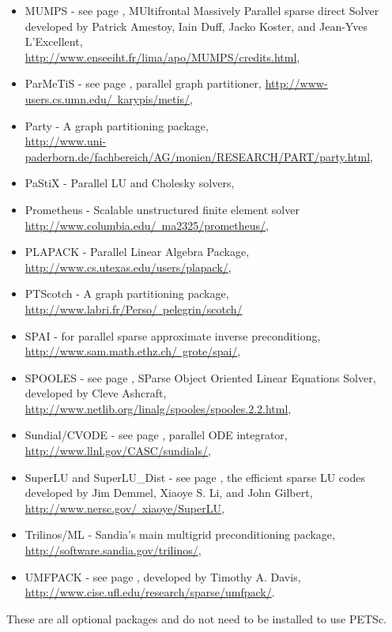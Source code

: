 \begin{itemize}
  \item MUMPS -      see page \pageref{sec_externalsol}, MUltifrontal Massively Parallel sparse direct Solver developed by Patrick Amestoy, 
                     Iain Duff, Jacko Koster, and Jean-Yves L'Excellent, \\
                     \href{http://www.enseeiht.fr/lima/apo/MUMPS/credits.html}{http://www.enseeiht.fr/lima/apo/MUMPS/credits.html},
  \item ParMeTiS -     see page \pageref{sec_partitioning}, parallel graph partitioner,
                     \href{http://www-users.cs.umn.edu/~karypis/metis/}{http://www-users.cs.umn.edu/~karypis/metis/},
  \item Party -     A graph partitioning package, \\ \href{http://www.uni-paderborn.de/fachbereich/AG/monien/RESEARCH/PART/party.html}{http://www.uni-paderborn.de/fachbereich/AG/monien/RESEARCH/PART/party.html},
  \item PaStiX -     Parallel LU and Cholesky solvers,
  \item Prometheus - Scalable unstructured finite element solver \href{http://www.columbia.edu/~ma2325/prometheus/}{http://www.columbia.edu/~ma2325/prometheus/},
  \item PLAPACK - Parallel Linear Algebra Package, \href{http://www.cs.utexas.edu/users/plapack/}{http://www.cs.utexas.edu/users/plapack/},
  \item PTScotch -    A graph partitioning package, \href{http://www.labri.fr/Perso/~pelegrin/scotch/}{http://www.labri.fr/Perso/~pelegrin/scotch/}
  \item SPAI -        for parallel sparse approximate inverse preconditiong, 
                     \href{http://www.sam.math.ethz.ch/~grote/spai/}{http://www.sam.math.ethz.ch/~grote/spai/},
  \item SPOOLES - see page \pageref{sec_externalsol}, SParse Object Oriented Linear Equations Solver, developed by Cleve Ashcraft, 
                    \href{http://www.netlib.org/linalg/spooles/spooles.2.2.html}{http://www.netlib.org/linalg/spooles/spooles.2.2.html},
  \item Sundial/CVODE - see page \pageref{sec_sundials}, parallel ODE integrator,
                     \href{http://www.llnl.gov/CASC/sundials/}{http://www.llnl.gov/CASC/sundials/},
  \item SuperLU and SuperLU\_Dist - see page \pageref{sec_externalsol}, 
                    the efficient sparse LU codes developed by Jim Demmel,  Xiaoye S. Li, and John Gilbert, 
                    \href{http://www.nersc.gov/~xiaoye/SuperLU}{http://www.nersc.gov/~xiaoye/SuperLU},
  \item Trilinos/ML - Sandia's main multigrid preconditioning package, \href{http://software.sandia.gov/trilinos/}{http://software.sandia.gov/trilinos/},
  \item UMFPACK - see page \pageref{sec_externalsol}, 
                    developed by Timothy A. Davis, 
                    \href{http://www.cise.ufl.edu/research/sparse/umfpack/}{http://www.cise.ufl.edu/research/sparse/umfpack/}.
\end{itemize}
These are all optional packages and do not need to be installed to use PETSc.

